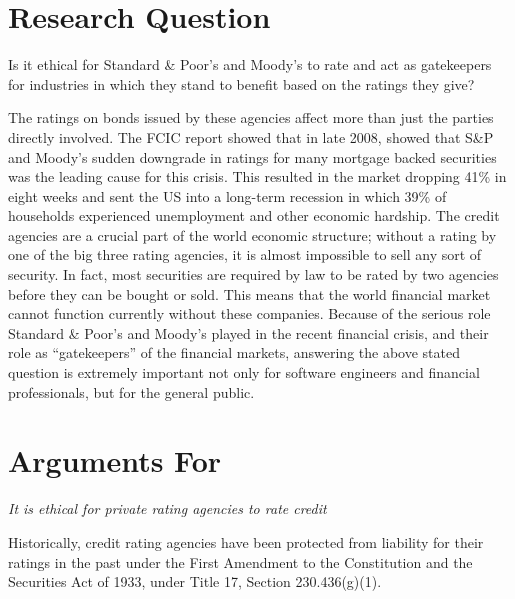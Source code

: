 \documentclass[11pt]{article}
\begin{document}
\begin{multicols}{2}

\section{Research Question}
Is it ethical for Standard \& Poor's and Moody's to rate and act as gatekeepers for industries in which they stand to benefit based on the ratings they give?

The ratings on bonds issued by these agencies affect more than just the parties directly involved. The FCIC report showed that in late 2008, showed that S\&P and Moody's sudden downgrade in ratings for many mortgage backed securities was the leading cause for this crisis. \cite{huffCreditCause}  This resulted in the market dropping 41\% in eight weeks \cite{marketWatch} and sent the US into a long-term recession in which 39\% of households experienced unemployment and other economic hardship. \cite{collapseImpact}  The credit agencies are a crucial part of the world economic structure; without a rating by one of the big three rating agencies, it is almost impossible to sell any sort of security.  In fact, most securities are required by law to be rated by two agencies before they can be bought or sold. \cite{wpMoodies}  This means that the world financial market cannot function currently without these companies.  Because of the serious role Standard \& Poor's and Moody's played in the recent financial crisis, and their role as ``gatekeepers'' of the financial markets, answering the above stated question is extremely important not only for software engineers and financial professionals, but for the general public.    


\section{Arguments For}
\textit{It is ethical for private rating agencies to rate credit}

Historically, credit rating agencies have been protected from liability for their ratings in the past under the First Amendment to the Constitution and the Securities Act of 1933, under Title 17, Section 230.436(g)(1).  


\end{multicols}
\end{document}
